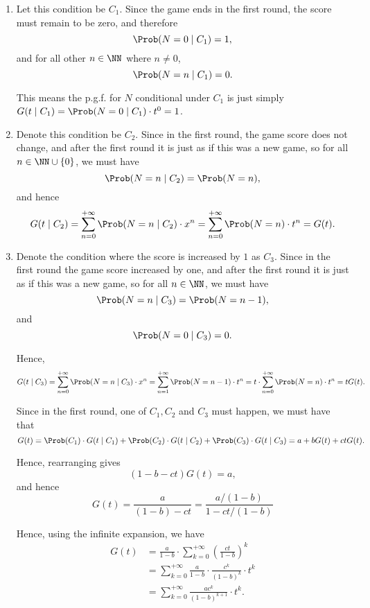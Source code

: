 \Question{\currfilebase}
\begin{enumerate}
    \item Let this condition be \(C_1\). Since the game ends in the first round, the score must remain to be zero, and therefore
          \[
              \Prob(N = 0 \mid C_1) = 1,
          \]
          and for all other \(n \in \NN\) where \(n \neq 0\),
          \[
              \Prob(N = n \mid C_1) = 0.
          \]

          This means the p.g.f. for \(N\) conditional under \(C_1\) is just simply \(G(t \mid C_1) = \Prob(N = 0 \mid C_1) \cdot t^0 = 1\).

    \item Denote this condition be \(C_2\). Since in the first round, the game score does not change, and after the first round it is just as if this was a new game, so for all \(n \in \NN \cup \{0\}\), we must have
          \[
              \Prob(N = n \mid C_2) = \Prob(N = n),
          \]
          and hence
          \[
              G(t \mid C_2) = \sum_{n = 0}^{+\infty} \Prob(N = n \mid C_2) \cdot x^n = \sum_{n = 0}^{+\infty} \Prob(N = n) \cdot t^n = G(t).
          \]

    \item Denote the condition where the score is increased by \(1\) as \(C_3\). Since in the first round the game score increased by one, and after the first round it is just as if this was a new game, so for all \(n \in \NN\), we must have
          \[
              \Prob(N = n \mid C_3) = \Prob(N = n - 1),
          \]
          and
          \[
              \Prob(N = 0 \mid C_3) = 0.
          \]

          Hence,
          \[
              G(t \mid C_3) = \sum_{n = 0}^{+\infty} \Prob(N = n \mid C_3) \cdot x^n = \sum_{n = 1}^{+\infty} \Prob(N = n - 1) \cdot t^n = t \cdot \sum_{n = 0}^{+\infty} \Prob(N = n) \cdot t^n= tG(t).
          \]

          Since in the first round, one of \(C_1, C_2\) and \(C_3\) must happen, we must have that
          \[
              G(t) = \Prob(C_1) \cdot G(t \mid C_1) + \Prob(C_2) \cdot G(t \mid C_2) + \Prob(C_3) \cdot G(t \mid C_3) = a + b G(t) + ctG(t).
          \]

          Hence, rearranging gives
          \[
              (1 - b - ct) G(t) = a,
          \]
          and hence
          \[
              G(t) = \frac{a}{(1 - b) - ct} = \frac{a / (1 - b)}{1 - ct / (1 - b)}
          \]

          Hence, using the infinite expansion, we have
          \begin{align*}
              G(t) & = \frac{a}{1-b} \cdot \sum_{k = 0}^{+\infty} \left(\frac{ct}{1 - b}\right)^k   \\
                   & = \sum_{k = 0}^{+\infty} \frac{a}{1 - b} \cdot \frac{c^k}{(1 - b)^k} \cdot t^k \\
                   & = \sum_{k = 0}^{+\infty} \frac{ac^k}{(1 - b)^{k + 1}} \cdot t^k.
          \end{align*}


\end{enumerate}
